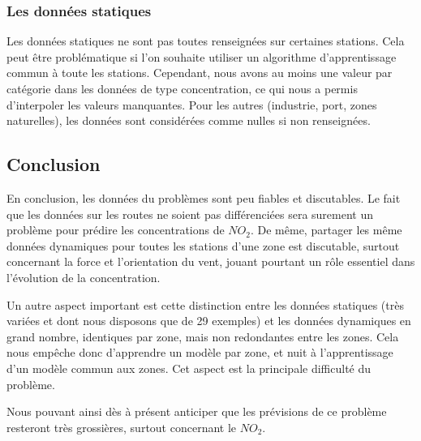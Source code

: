 \subsubsection{Les données statiques}

Les données statiques ne sont pas toutes renseignées sur certaines stations. Cela peut être problématique si l'on souhaite utiliser un algorithme d'apprentissage commun à toute les stations. Cependant, nous avons au moins une valeur par catégorie dans les données de type concentration, ce qui nous a permis d'interpoler les valeurs manquantes. Pour les autres (industrie, port, zones naturelles), les données sont considérées comme nulles si non renseignées.


\subsection{Conclusion}

En conclusion, les données du problèmes sont peu fiables et discutables. Le fait que les données sur les routes ne soient pas différenciées sera surement un problème pour prédire les concentrations de $NO_2$. De même, partager les même données dynamiques pour toutes les stations d'une zone est discutable, surtout concernant la force et l'orientation du vent, jouant pourtant un rôle essentiel dans l'évolution de la concentration.

Un autre aspect important est cette distinction entre les données statiques (très variées et dont nous disposons que de 29 exemples) et les données dynamiques en grand nombre, identiques par zone, mais non redondantes entre les zones. Cela nous empêche donc d'apprendre un modèle par zone, et nuit à l'apprentissage d'un modèle commun aux zones. Cet aspect est la principale difficulté du problème.  

Nous pouvant ainsi dès à présent anticiper que les prévisions de ce problème resteront très grossières, surtout concernant le $NO_2$.

